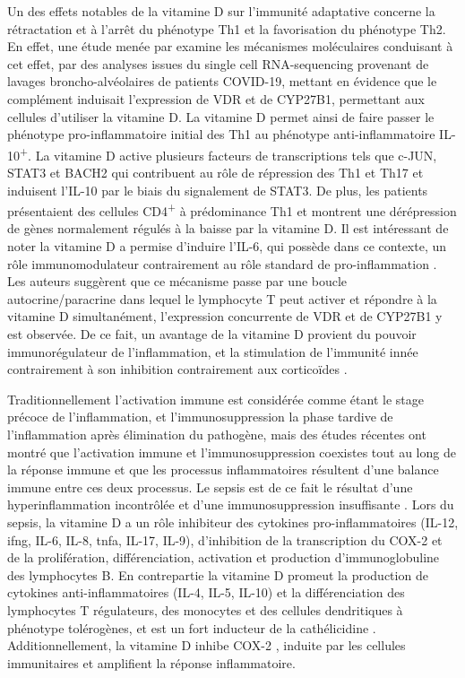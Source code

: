 \documentclass[
  a4paper,
  DIV=11,
  numbers=noendperiod,
  listof=totoc]{scrreprt}
\begin{document}
Un des effets notables de la vitamine D sur l'immunité adaptative
concerne la rétractation et à l'arrêt du phénotype \ac{Th1} et la
favorisation du phénotype Th2. En effet, une étude menée par
\textcite{Chauss.2022} examine les mécanismes moléculaires conduisant à
cet effet, par des analyses issues du single cell RNA-sequencing
provenant de lavages broncho-alvéolaires de patients \ac{COVID-19},
mettant en évidence que le complément induisait l'expression de \ac{VDR}
et de \ac{CYP27B1}, permettant aux cellules d'utiliser la vitamine D. La
vitamine D permet ainsi de faire passer le phénotype pro-inflammatoire
initial des \ac{Th1} au phénotype anti-inflammatoire
IL-10\textsuperscript{+}. La vitamine D active plusieurs facteurs de
transcriptions tels que c-JUN, STAT3 et BACH2 qui contribuent au rôle de
répression des \ac{Th1} et \ac{Th17} et induisent l'IL-10 par le biais
du signalement de STAT3. De plus, les patients présentaient des cellules
CD4\textsuperscript{+} à prédominance \ac{Th1} et montrent une
dérépression de gènes normalement régulés à la baisse par la vitamine D.
Il est intéressant de noter la vitamine D a permise d'induire l'IL-6,
qui possède dans ce contexte, un rôle immunomodulateur contrairement au
rôle standard de pro-inflammation \autocite{Chauss.2022}. Les auteurs
suggèrent que ce mécanisme passe par une boucle autocrine/paracrine dans
lequel le lymphocyte T peut activer et répondre à la vitamine D
simultanément, l'expression concurrente de \ac{VDR} et de \ac{CYP27B1} y
est observée. De ce fait, un avantage de la vitamine D provient du
pouvoir immunorégulateur de l'inflammation, et la stimulation de
l'immunité innée contrairement à son inhibition contrairement aux
corticoïdes \autocite{Bouillon.2021}.

Traditionnellement l'activation immune est considérée comme étant le
stage précoce de l'inflammation, et l'immunosuppression la phase tardive
de l'inflammation après élimination du pathogène, mais des études
récentes ont montré que l'activation immune et l'immunosuppression
coexistes tout au long de la réponse immune et que les processus
inflammatoires résultent d'une balance immune entre ces deux processus.
Le sepsis est de ce fait le résultat d'une hyperinflammation incontrôlée
et d'une immunosuppression insuffisante \autocite{Cutuli.2024}. Lors du
sepsis, la vitamine D a un rôle inhibiteur des cytokines
pro-inflammatoires (\ac{IL}-12, \ac{ifng}, IL-6, IL-8, \ac{tnfa}, IL-17,
IL-9), d'inhibition de la transcription du COX-2 et de la prolifération,
différenciation, activation et production d'immunoglobuline des
lymphocytes B. En contrepartie la vitamine D promeut la production de
cytokines anti-inflammatoires (\ac{IL}-4, IL-5, IL-10) et la
différenciation des lymphocytes T régulateurs, des monocytes et des
cellules dendritiques à phénotype tolérogènes, et est un fort inducteur
de la cathélicidine \autocite{Cutuli.2024}. Additionnellement, la
vitamine D inhibe \ac{COX-2} \autocite{Wang.2014}, induite par les
cellules immunitaires et amplifient la réponse inflammatoire.
\end{document}

